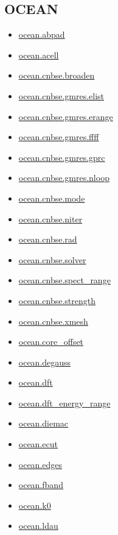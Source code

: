 \documentclass[11pt]{article}
\begin{document}
\subsection*{OCEAN}
\begin{itemize}
\item \hyperref[kw:ocean-abpad]{ocean.abpad}
\item \hyperref[kw:ocean-acell]{ocean.acell}
\item \hyperref[kw:ocean-cnbse-broaden]{ocean.cnbse.broaden}
\item \hyperref[kw:ocean-cnbse-gmres-elist]{ocean.cnbse.gmres.elist}
\item \hyperref[kw:ocean-cnbse-gmres-erange]{ocean.cnbse.gmres.erange}
\item \hyperref[kw:ocean-cnbse-gmres-ffff]{ocean.cnbse.gmres.ffff}
\item \hyperref[kw:ocean-cnbse-gmres-gprc]{ocean.cnbse.gmres.gprc}
\item \hyperref[kw:ocean-cnbse-gmres-nloop]{ocean.cnbse.gmres.nloop}
\item \hyperref[kw:ocean-cnbse-mode]{ocean.cnbse.mode}
\item \hyperref[kw:ocean-cnbse-niter]{ocean.cnbse.niter}
\item \hyperref[kw:ocean-cnbse-rad]{ocean.cnbse.rad}
\item \hyperref[kw:ocean-cnbse-solver]{ocean.cnbse.solver}
\item \hyperref[kw:ocean-cnbse-spect-range]{ocean.cnbse.spect\_range}
\item \hyperref[kw:ocean-cnbse-strength]{ocean.cnbse.strength}
\item \hyperref[kw:ocean-cnbse-xmesh]{ocean.cnbse.xmesh}
\item \hyperref[kw:ocean-core-offset]{ocean.core\_offset}
\item \hyperref[kw:ocean-degauss]{ocean.degauss}
\item \hyperref[kw:ocean-dft]{ocean.dft}
\item \hyperref[kw:ocean-dft-energy-range]{ocean.dft\_energy\_range}
\item \hyperref[kw:ocean-diemac]{ocean.diemac}
\item \hyperref[kw:ocean-ecut]{ocean.ecut}
\item \hyperref[kw:ocean-edges]{ocean.edges}
\item \hyperref[kw:ocean-fband]{ocean.fband}
\item \hyperref[kw:ocean-k0]{ocean.k0}
\item \hyperref[kw:ocean-ldau]{ocean.ldau}

\end{itemize}
\end{document}
